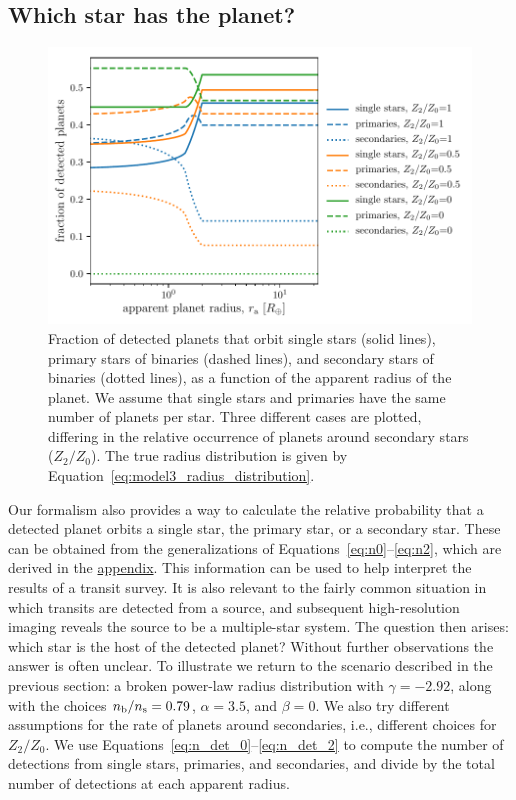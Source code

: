 \documentclass[12pt,modern]{aastex61}
\newcommand{\s}{_{\rm s}}
\renewcommand{\b}{_{\rm b}}
\begin{document}
\subsection{Which star has the planet?}
\label{subsec:whichstar}
\begin{figure}[!t]
    \centering
    \includegraphics[width=\textwidth]{figures/ndet_vs_radius_logx_model_3_fraclines_rpu_22.5_manyZs.pdf}
    \caption{ Fraction of detected planets that orbit single stars
      (solid lines), primary stars of binaries (dashed lines), and
      secondary stars of binaries (dotted lines), as a function of the
      apparent radius of the planet.  We assume that single stars and
      primaries have the same number of planets per star.  Three
      different cases are plotted, differing in the relative
      occurrence of planets around secondary stars ($Z_2/Z_0$).  The
      true radius distribution is given by
      Equation~\ref{eq:model3_radius_distribution}.}
    \label{fig:frac_model_3}
\end{figure}

Our formalism also provides a way to calculate the relative
probability that a detected planet orbits a single star, the primary
star, or a secondary star.  These can be obtained from the
generalizations of Equations~\ref{eq:n0}--\ref{eq:n2}, which are
derived in the \hyperref[sec:appendix]{appendix}.  This information
can be used to help interpret the results of a transit survey.  It is
also relevant to the fairly common situation in which transits are
detected from a source, and subsequent high-resolution imaging reveals
the source to be a multiple-star system.  The question then arises:
which star is the host of the detected planet?  Without further
observations the answer is often unclear.  To illustrate we return to
the scenario described in the previous section: a broken power-law
radius distribution with $\gamma=-2.92$, along with the choices
$n\b/n\s=0.79$, $\alpha = 3.5$, and $\beta=0$.  We also try different
assumptions for the rate of planets around secondaries, i.e.,
different choices for $Z_2/Z_0$.  We use
Equations~\ref{eq:n_det_0}--\ref{eq:n_det_2} to compute the number of
detections from single stars, primaries, and secondaries, and divide
by the total number of detections at each apparent radius.
\end{document}
